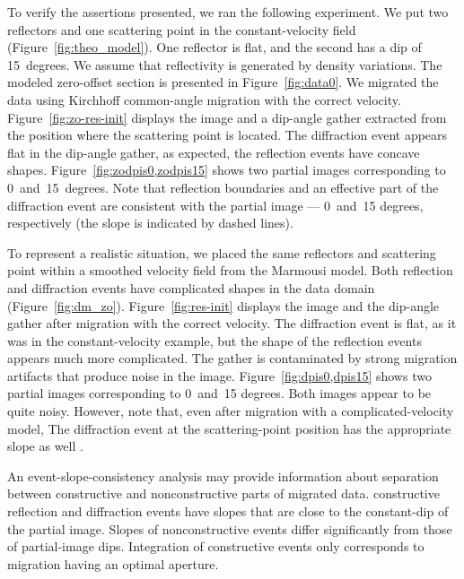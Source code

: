 To verify the assertions presented, we ran the following experiment. We put two reflectors and one scattering point in the constant-velocity field
(Figure~\ref{fig:theo_model}). One reflector is flat, and the second has a dip of 15~degrees. We assume that reflectivity is generated
by density variations. The modeled zero-offset section is presented in Figure~\ref{fig:data0}. We migrated the data using Kirchhoff common-angle
migration with the correct velocity. Figure~\ref{fig:zo-res-init} displays the image and a dip-angle gather extracted from 
the position where the scattering point is located. The diffraction event appears flat in the dip-angle gather, as expected,  the reflection
events have concave shapes. Figure~\ref{fig:zodpis0,zodpis15} shows two partial images corresponding to 0~and~15~degrees.
Note that reflection boundaries and an effective part of the diffraction event are consistent with the partial image --- 0~and~15 degrees, 
respectively (the slope is indicated by dashed lines).

To represent a realistic situation, we placed the same reflectors and scattering point within a smoothed velocity field from the Marmousi model.
Both reflection and diffraction events have complicated shapes in the data domain (Figure~\ref{fig:dm_zo}). Figure~\ref{fig:res-init}
displays the image and the dip-angle gather after migration with the correct velocity.  The diffraction event is flat, as it was in the
constant-velocity example, but the shape of the reflection events appears much more complicated. The gather is contaminated by strong
migration artifacts that produce noise in the image. Figure~\ref{fig:dpis0,dpis15} shows two partial images corresponding to 0~and~15 degrees.
Both images appear to be quite noisy. However, note that, even after migration with a complicated-velocity model,  The diffraction event at the scattering-point position has the appropriate slope as well . 

An event-slope-consistency analysis may provide information about separation between constructive
and nonconstructive parts of migrated data.  constructive reflection and diffraction events have slopes
that are close to the constant-dip of the partial image. Slopes of nonconstructive events differ significantly from those of partial-image
dips. Integration of constructive events only corresponds to migration having an optimal
aperture.

